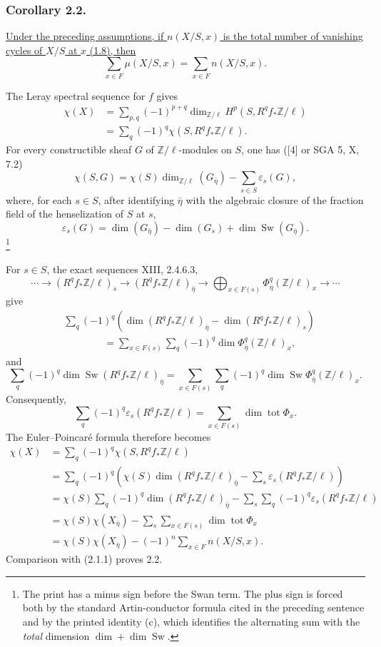 \subsubsection*{Corollary 2.2.}
\underline{Under the preceding assumptions, if $n(X/S,x)$ is the
total number of vanishing cycles of $X/S$ at $x$ (1.8), then}
\[
\sum_{x\in F}\mu(X/S,x)=\sum_{x\in F}n(X/S,x).
\]

The Leray spectral sequence for $f$ gives
\begin{align*}
\chi(X)
&=\sum_{p,q}(-1)^{p+q}
\dim_{\mathbb Z/\ell}H^p(S,R^qf_*\mathbb Z/\ell)\\
&=\sum_q(-1)^q\chi(S,R^qf_*\mathbb Z/\ell).
\end{align*}
For every constructible sheaf $G$ of $\mathbb Z/\ell$-modules on
$S$, one has ([4] or SGA 5, X, 7.2)
\[
\chi(S,G)=\chi(S)\dim_{\mathbb Z/\ell}(G_{\bar\eta})
-\sum_{s\in S}\varepsilon_s(G),
\]
where, for each $s\in S$, after identifying $\bar\eta$ with the
algebraic closure of the fraction field of the henselization of $S$
at $s$,
\[
\varepsilon_s(G)=
\dim(G_{\bar\eta})-\dim(G_s)+\dim\operatorname{Sw}(G_{\bar\eta}).
\]
\footnote{The print has a minus sign before the Swan term.  The plus
sign is forced both by the standard Artin-conductor formula cited in
the preceding sentence and by the printed identity (c), which
identifies the alternating sum with the \emph{total} dimension
$\dim+\dim\operatorname{Sw}$.}

For $s\in S$, the exact sequences XIII, 2.4.6.3,
\[
\cdots\longrightarrow(R^qf_*\mathbb Z/\ell)_s
\longrightarrow(R^qf_*\mathbb Z/\ell)_{\bar\eta}
\longrightarrow\bigoplus_{x\in F(s)}
\Phi^q_{\bar\eta}(\mathbb Z/\ell)_x
\longrightarrow\cdots
\]
give
\begin{align*}
&\sum_q(-1)^q\left(
\dim(R^qf_*\mathbb Z/\ell)_{\bar\eta}
-\dim(R^qf_*\mathbb Z/\ell)_s\right)\\
&\hspace{4em}=\sum_{x\in F(s)}\sum_q(-1)^q
\dim\Phi^q_{\bar\eta}(\mathbb Z/\ell)_x,
\end{align*}
and
\[
\sum_q(-1)^q\dim\operatorname{Sw}
(R^qf_*\mathbb Z/\ell)_{\bar\eta}
=\sum_{x\in F(s)}\sum_q(-1)^q
\dim\operatorname{Sw}\Phi^q_{\bar\eta}(\mathbb Z/\ell)_x.
\]
Consequently,
\begin{equation}\tag{c}
\sum_q(-1)^q\varepsilon_s(R^qf_*\mathbb Z/\ell)
=\sum_{x\in F(s)}\dim\operatorname{tot}\Phi_x.
\end{equation}
The Euler--Poincar\'e formula therefore becomes
\begin{align*}
\chi(X)
&=\sum_q(-1)^q\chi(S,R^qf_*\mathbb Z/\ell)\\
&=\sum_q(-1)^q\left(
\chi(S)\dim(R^qf_*\mathbb Z/\ell)_{\bar\eta}
-\sum_s\varepsilon_s(R^qf_*\mathbb Z/\ell)\right)\\
&=\chi(S)\sum_q(-1)^q
\dim(R^qf_*\mathbb Z/\ell)_{\bar\eta}
-\sum_s\sum_q(-1)^q\varepsilon_s(R^qf_*\mathbb Z/\ell)\\
&=\chi(S)\chi(X_{\bar\eta})
-\sum_s\sum_{x\in F(s)}\dim\operatorname{tot}\Phi_x\\
&=\chi(S)\chi(X_{\bar\eta})
-(-1)^n\sum_{x\in F}n(X/S,x).
\end{align*}
Comparison with (2.1.1) proves 2.2.
